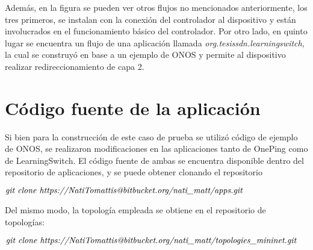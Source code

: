 Además, en la figura se pueden ver otros flujos no mencionados anteriormente, los tres primeros, se instalan con la conexión del controlador al dispositivo y están involucrados en el funcionamiento básico del controlador. Por otro lado, en quinto lugar se encuentra un flujo de una aplicación llamada \textit{org.tesissdn.learningswitch}, la cual se construyó en base a un ejemplo de ONOS \parencite{onos-samples} y permite al dispositivo realizar redireccionamiento de capa 2.


\section{Código fuente de la aplicación}
Si bien para la construcción de este caso de prueba se utilizó código de ejemplo de ONOS, se realizaron modificaciones en las aplicaciones tanto de OnePing como de LearningSwitch. El código fuente de ambas se encuentra disponible dentro del repositorio de aplicaciones, y se puede obtener clonando el repositorio
\begin{center}
    $ \emph {git clone https://NatiTomattis@bitbucket.org/nati\_matt/apps.git}$
\end{center}

Del mismo modo, la topología empleada se obtiene en el repositorio de topologías:
\begin{center}
    $ \emph {git clone https://NatiTomattis@bitbucket.org/nati\_matt/topologies\_mininet.git}$
\end{center}
